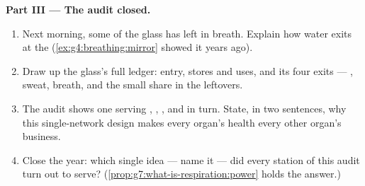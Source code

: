 \begin{problem}
\medskip\noindent\textbf{Part III --- The audit closed.}
\begin{enumerate}[resume]
  \item Next morning, some of the glass has left in
        breath. Explain how water exits at the 
        (\cref{ex:g4:breathing:mirror} showed it years
        ago).
  \item Draw up the glass's full ledger: entry, stores
        and uses, and its four exits --- , sweat,
        breath, and the small share in the leftovers.
  \item The audit shows one  serving , ,
        ,  and  in turn. State, in
        two sentences, why this single-network design
        makes every organ's health every other organ's
        business.
  \item Close the year: which single idea --- name it
        --- did every station of this audit turn out to
        serve? (\cref{prop:g7:what-is-respiration:power}
        holds the answer.)
\end{enumerate}
\end{problem}
